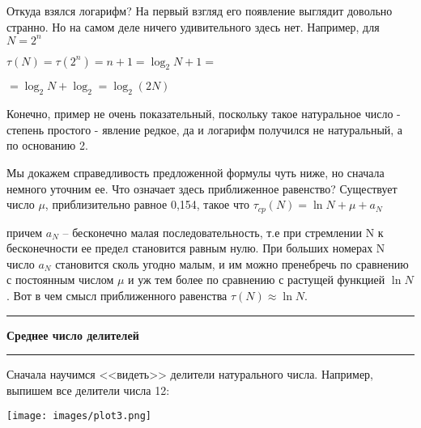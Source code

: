\documentclass{article}
\begin{document}
\begin{multicols*}{3}
\small
Откуда взялся логарифм? На первый взгляд его появление выглядит довольно странно. Но на самом деле ничего удивительного здесь нет. Например, для \begin{math}
    N = 2^n
\end{math}

\noindent
\small{
\begin{math}
   \tau(N) = \tau(2^n) = n + 1 = \log_2 N + 1 = 
\end{math}
}

\begin{math}
 = \log_2 N + \log_2 = \log_2(2N)
\end{math}

Конечно, пример не очень показательный, поскольку такое натуральное число - степень простого - явление редкое, да и логарифм получился не натуральный, а по основанию 2.

Мы докажем справедливость предложенной формулы чуть ниже, но сначала немного уточним ее. Что означает здесь приближенное равенство? Существует число \begin{math}
    \mu
\end{math}, приблизительно равное 0,154, такое что
\small{
\begin{math}
    \tau_{cp}(N) = \ln N + \mu + a_N
\end{math}
}

\noindent причем \begin{math} a_N \end{math} -- бесконечно малая последовательность, т.е при стремлении N к бесконечности ее предел становится равным нулю. При больших номерах N число \begin{math}
    a_N
\end{math} становится сколь угодно малым, и им можно пренебречь по сравнению с постоянным числом \begin{math}\mu\end{math} и уж тем более по сравнению с растущей функцией \begin{math}\ln N\end{math}. 
Вот в чем смысл приближенного равенства $\tau(N) \approx \ln N$.

\noindent\rule{5.5cm}{0.5pt}

\noindent\large{\textbf{Среднее число делителей}}
\noindent\rule{5.5cm}{0.5pt}

\small
Сначала научимся <<видеть>> делители натурального числа. Например, выпишем все делители числа 12:

\texttt{[image: images/plot3.png]}
\vspace{10px}


\end{multicols*}
\end{document}
